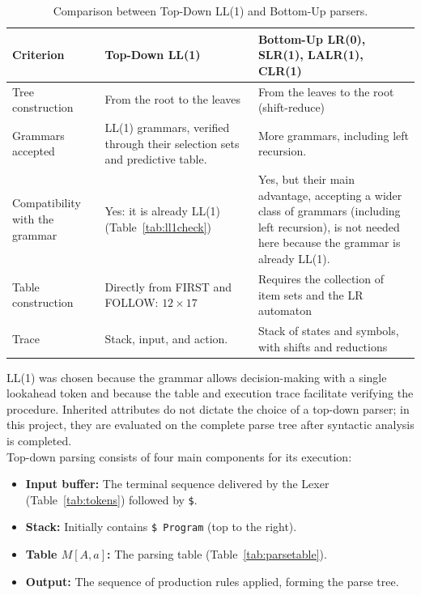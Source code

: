 \documentclass[12pt,letterpaper]{article}
\newcommand{\anchotabla}{0.9\textwidth} %
\begin{document}
\begin{table}[H]
\centering
\small
\renewcommand{\arraystretch}{1.2}
\begin{tabular}{@{}>{\raggedright\arraybackslash}p{0.20\dimexpr\anchotabla}
                  >{\raggedright\arraybackslash}p{0.36\dimexpr\anchotabla}
                  >{\raggedright\arraybackslash}p{0.38\dimexpr\anchotabla}@{}}
\toprule
\textbf{Criterion} & \textbf{Top-Down LL(1)} & \textbf{Bottom-Up LR(0), SLR(1), LALR(1), CLR(1)} \\
\midrule
Tree construction &
From the root to the leaves &
From the leaves to the root (shift-reduce) \\
\addlinespace
Grammars accepted &
LL(1) grammars, verified through their selection sets and predictive table. &
More grammars, including left recursion. \\
\addlinespace
Compatibility with the grammar &
Yes: it is already LL(1) (Table~\ref{tab:ll1check}) &
Yes, but their main advantage, accepting a wider class of grammars (including left recursion), is not needed here because the grammar is already LL(1). \\
\addlinespace
Table construction &
Directly from FIRST and FOLLOW: $12 \times 17$ &
Requires the collection of item sets and the LR automaton \\
\addlinespace
Trace &
Stack, input, and action. &
Stack of states and symbols, with shifts and reductions \\
\bottomrule
\end{tabular}
\caption{Comparison between Top-Down LL(1) and Bottom-Up parsers.}
\end{table}

LL(1) was chosen because the grammar allows decision-making with a single lookahead token and because the table and execution trace facilitate verifying the procedure. Inherited attributes do not dictate the choice of a top-down parser; in this project, they are evaluated on the complete parse tree after syntactic analysis is completed.\\

Top-down parsing consists of four main components for its execution:
\begin{itemize}
    \item \textbf{Input buffer:} The terminal sequence delivered by the Lexer (Table~\ref{tab:tokens}) followed by \texttt{\$}.
    \item \textbf{Stack:} Initially contains \texttt{\$ Program} (top to the right).
    \item \textbf{Table $M[A, a]$:} The parsing table (Table~\ref{tab:parsetable}).
    \item \textbf{Output:} The sequence of production rules applied, forming the parse tree.
\end{itemize}
\end{document}
